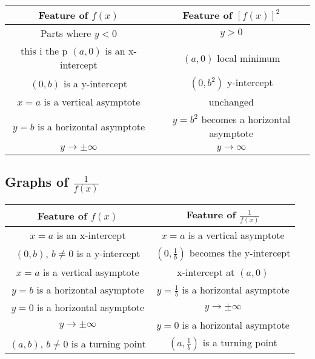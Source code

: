 \documentclass[11pt]{article}
\begin{document}
\begin{center}
  \def\arraystretch{2}%
  \begin{tabular}{c|c}
    Feature of $f(x)$               & Feature of $[f(x)]^2$                    \\ \hline
    Parts where $y < 0$             & $y > 0$                                  \\
    this i the p
    $(a, 0)$ is an x-intercept      & $(a, 0)$ local minimum                   \\
    $(0, b)$ is a y-intercept       & $(0, b^2)$ y-intercept                   \\
    $x=a$ is a vertical asymptote   & unchanged                                \\
    $y=b$ is a horizontal asymptote & $y = b^2$ becomes a horizontal asymptote \\
    $y\to \pm\infty$                & $y \to \infty$                           \\
  \end{tabular}
\end{center}


\subsection{Graphs of \texorpdfstring{$\frac{1}{f(x)}$}{the reciprocal of f(x)}}

\begin{center}
  \def\arraystretch{2}%
  \begin{tabular}{c|c}
    Feature of $f(x)$                      & Feature of $\frac{1}{f(x)}$                 \\ \hline
    $x=a$ is an x-intercept                & $x = a$ is a vertical asymptote             \\
    $(0, b),\, b\not=0$ is a y-intercept   & $(0, \frac{1}{b})$ becomes the y-intercept  \\
    $x=a$ is a vertical asymptote          & x-intercept at $(a, 0)$                     \\
    $y=b$ is a horizontal asymptote        & $y = \frac{1}{b}$ is a horizontal asymptote \\
    $y=0$ is a horizontal asymptote        & $y\to \pm \infty$                           \\
    $y\to \pm\infty$                       & $y = 0$ is a horizontal asymptote           \\
    $(a, b),\, b\not=0$ is a turning point & $(a, \frac{1}{b})$ is a turning point       \\
  \end{tabular}
\end{center}
\end{document}

